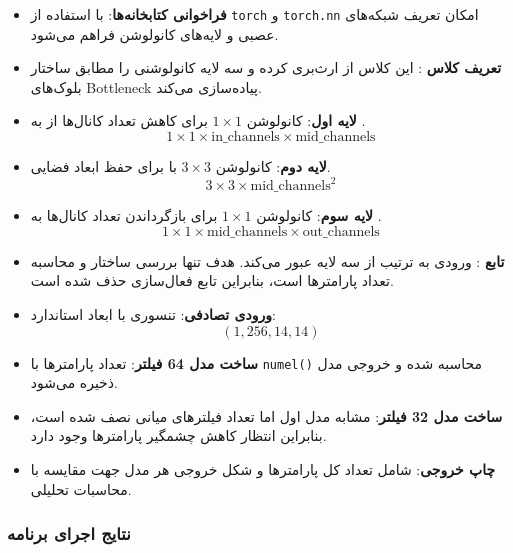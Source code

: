 \documentclass{article}
\begin{document}
\begin{itemize}
	\item \textbf{فراخوانی کتابخانه‌ها}:  
	با استفاده از \texttt{torch} و \texttt{torch.nn} امکان تعریف شبکه‌های عصبی و لایه‌های کانولوشن فراهم می‌شود.
	
	\item \textbf{تعریف کلاس }:  
	این کلاس از  ارث‌بری کرده و سه لایه کانولوشنی را مطابق ساختار بلوک‌های Bottleneck پیاده‌سازی می‌کند.
	
	\item \textbf{لایه اول}:  
	کانولوشن \(1\times1\) برای کاهش تعداد کانال‌ها از  به .  
	\[
	1\times1\times \text{in\_channels} \times \text{mid\_channels}
	\]
	
	\item \textbf{لایه دوم}:  
	کانولوشن \(3\times3\) با  برای حفظ ابعاد فضایی.  
	\[
	3\times3\times \text{mid\_channels}^2
	\]
	
	\item \textbf{لایه سوم}:  
	کانولوشن \(1\times1\) برای بازگرداندن تعداد کانال‌ها به .  
	\[
	1\times1\times \text{mid\_channels} \times \text{out\_channels}
	\]
	
	\item \textbf{تابع }:  
	ورودی به ترتیب از سه لایه عبور می‌کند. هدف تنها بررسی ساختار و محاسبه تعداد پارامترها است، بنابراین تابع فعال‌سازی حذف شده است.
	
	\item \textbf{ورودی تصادفی}:  
	تنسوری با ابعاد استاندارد:
	\[
	(1, 256, 14, 14)
	\]
	
	\item \textbf{ساخت مدل 64 فیلتر}:  
	تعداد پارامترها با \texttt{numel()} محاسبه شده و خروجی مدل ذخیره می‌شود.
	
	\item \textbf{ساخت مدل 32 فیلتر}:  
	مشابه مدل اول اما تعداد فیلترهای میانی نصف شده است، بنابراین انتظار کاهش چشمگیر پارامترها وجود دارد.
	
	\item \textbf{چاپ خروجی}:  
	شامل تعداد کل پارامترها و شکل خروجی هر مدل جهت مقایسه با محاسبات تحلیلی.
\end{itemize}

\subsubsection{نتایج اجرای برنامه}
\end{document}

